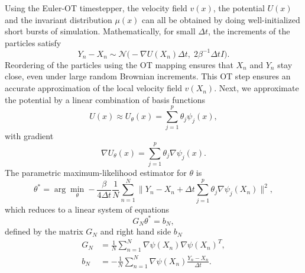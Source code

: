 \documentclass{article}
\begin{document}
Using the Euler-OT timestepper, the velocity field $v(x)$, the potential $U(x)$ and the invariant distribution $\mu(x)$ can all be obtained by doing well-initialized short bursts of simulation. Mathematically, for small $\Delta t$, the increments of the particles satisfy
\begin{equation}
 Y_n - X_n \sim \mathcal{N}\big(-\nabla U(X_n)\Delta t,\; 2\beta^{-1}\Delta t I\big). \label{eq:traj}
\end{equation}
Reordering of the particles using the OT mapping ensures that $X_n$ and $Y_n$ stay close, even under large random Brownian increments. This OT step ensures an accurate approximation of the local velocity field $v(X_n)$. Next, we approximate the potential by a linear combination of basis functions
\begin{equation}
 U(x) \approx U_\theta(x) = \sum_{j=1}^p \theta_j \psi_j(x),
\end{equation}
with gradient
\begin{equation}
 \nabla U_\theta(x) = \sum_{j=1}^p \theta_j \nabla \psi_j(x).
\end{equation}
The parametric maximum-likelihood estimator for $\theta$ is
\begin{equation}
 \theta^* = \arg\min_\theta -\frac{\beta}{4\Delta t}\frac{1}{N}\sum_{n=1}^N \bigg\| Y_n - X_n + \Delta t \sum_{j=1}^p \theta_j \nabla\psi_j(X_n) \bigg\|^2, \label{eq:mle}
\end{equation}
which reduces to a linear system of equations
\begin{equation}
 G_N\theta^* = b_N,
\end{equation}
defined by the matrix $G_N$ and right hand side $b_N$
\begin{align}
 G_N &= \frac{1}{N}\sum_{n=1}^N \nabla \psi(X_n)\nabla\psi(X_n)^T, \\
 b_N &= -\frac{1}{N}\sum_{n=1}^N \nabla \psi(X_n)\frac{Y_n - X_n}{\Delta t}.
\end{align}
\end{document}

